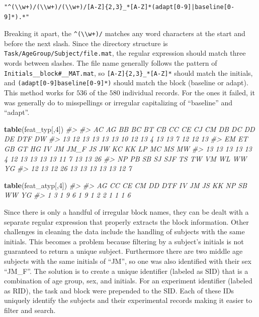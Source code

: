 \documentclass[11pt, oneside, openany]{scrbook}
\newenvironment{Shaded}{\begin{snugshade}}{\end{snugshade}}
\newcommand{\CommentTok}[1]{\textcolor[rgb]{0.56,0.35,0.01}{\textit{#1}}}
\newcommand{\DecValTok}[1]{\textcolor[rgb]{0.00,0.00,0.81}{#1}}
\newcommand{\KeywordTok}[1]{\textcolor[rgb]{0.13,0.29,0.53}{\textbf{#1}}}
\newcommand{\NormalTok}[1]{#1}
\begin{document}
\begin{verbatim}
"^(\\w+)/(\\w+)/(\\w+)/[A-Z]{2,3}_*[A-Z]*(adapt[0-9]|baseline[0-9]*).*"
\end{verbatim}

Breaking it apart, the \texttt{\^{}(\textbackslash{}\textbackslash{}w+)/} matches any word characters at the start and before the next slash. Since the directory structure is \texttt{Task/AgeGroup/Subject/file.mat}, the regular expression should match three words between slashes. The file name generally follows the pattern of \texttt{Initials\_\_block\#\_\_MAT.mat}, so \texttt{{[}A-Z{]}\{2,3\}\_*{[}A-Z{]}*} should match the initials, and \texttt{(adapt{[}0-9{]}\textbar{}baseline{[}0-9{]}*)} should match the block (baseline or adapt). This method works for \(536\) of the \(580\) individual records. For the ones it failed, it was generally do to misspellings or irregular capitalizing of ``baseline'' and ``adapt''.

\begin{Shaded}
\begin{Highlighting}[]
\KeywordTok{table}\NormalTok{(feat_typ[,}\DecValTok{4}\NormalTok{])}
\CommentTok{#> }
\CommentTok{#>   AC   AG   BB   BC   BT   CB   CC   CE   CJ   CM   DB   DC   DD   DE  DTF   DW }
\CommentTok{#>   13   12   13   13   13   13   10   12   13    4   13   13    7   12   12   13 }
\CommentTok{#>   EM   ET   GB   GT   HG   IV   JM JM_F   JS   JW   KC   KK   LP   MC   MS   MW }
\CommentTok{#>   13   13   13   13   13    4   12   13   13   13   13   11    7   13   13   26 }
\CommentTok{#>   NP   PB   SB   SJ  SJF   TS   TW   VM   WL   WW   YG }
\CommentTok{#>   12   13   12   26   13   13   13   13   13   12    7}
\end{Highlighting}
\end{Shaded}

\begin{Shaded}
\begin{Highlighting}[]
\KeywordTok{table}\NormalTok{(feat_atyp[,}\DecValTok{4}\NormalTok{])}
\CommentTok{#> }
\CommentTok{#>  AG  CC  CE  CM  DD DTF  IV  JM  JS  KK  NP  SB  WW  YG }
\CommentTok{#>   1   3   1   9   6   1   9   1   2   2   1   1   1   6}
\end{Highlighting}
\end{Shaded}

Since there is only a handful of irregular block names, they can be dealt with a separate regular expression that properly extracts the block information. Other challenges in cleaning the data include the handling of subjects with the same initials. This becomes a problem because filtering by a subject's initials is not guaranteed to return a unique subject. Furthermore there are two middle age subjects with the same initials of ``JM'', so one was also identified with their sex ``JM\_F''. The solution is to create a unique identifier (labeled as SID) that is a combination of age group, sex, and initials. For an experiment identifier (labeled as RID), the task and block were prepended to the SID. Each of these IDs uniquely identify the subjects and their experimental records making it easier to filter and search.
\end{document}
